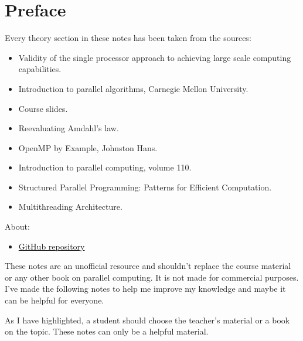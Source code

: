 \section*{Preface}

Every theory section in these notes has been taken from the sources:
\begin{itemize}
    \item Validity of the single processor approach to achieving large scale computing capabilities.\cite{amdahl2007validity}
    \item Introduction to parallel algorithms, Carnegie Mellon University.\cite{introductionToParallelAlgorithmsUMD}
    \item Course slides.\cite{parallel-computing-polimi}
    \item Reevaluating Amdahl's law.\cite{gustafson1988reevaluating}
    \item OpenMP by Example, Johnston Hans.\cite{whatIsOpenMPumassJohnstonHans}
    \item Introduction to parallel computing, volume 110.\cite{kumar1994introduction}
    \item Structured Parallel Programming: Patterns for Efficient Computation.\cite{mccool2012structured}
    \item Multithreading Architecture.\cite{nemirovsky2022multithreading}
\end{itemize}
About:
\begin{itemize}
    \item[\faIcon{github}] \href{https://github.com/PoliMI-HPC-E-notes-projects-AndreVale69/HPC-E-PoliMI-university-notes}{GitHub repository}
\end{itemize}
These notes are an unofficial resource and shouldn't replace the course material or any other book on parallel computing. It is not made for commercial purposes. I've made the following notes to help me improve my knowledge and maybe it can be helpful for everyone.

As I have highlighted, a student should choose the teacher's material or a book on the topic. These notes can only be a helpful material.
